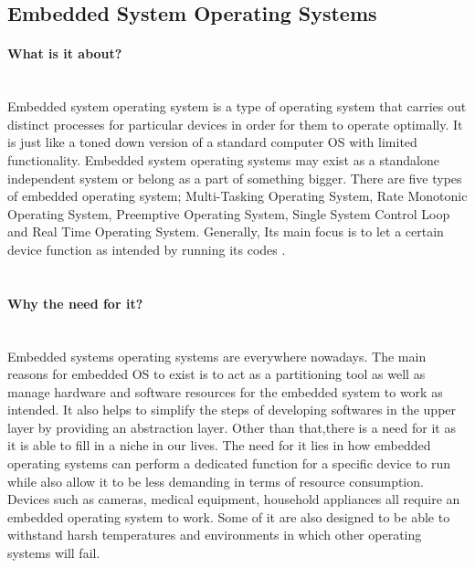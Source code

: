 \documentclass[conference]{IEEEtran}
\newcommand{\forceindent}{\leavevmode{\parindent=1em\indent}}
\begin{document}
\subsection{Embedded System Operating Systems}

\paragraph{What is it about?}\mbox{} \\
\forceindent Embedded system operating system is a type of operating system that carries out distinct processes for particular devices in order for them to operate optimally. It is just like a toned down version of a standard computer OS with limited functionality\cite{TNEOS}.
Embedded system operating systems may exist as a standalone independent system or belong as a part of something bigger. There are five types of embedded operating system; Multi-Tasking Operating System, Rate Monotonic Operating System, Preemptive Operating System, Single System Control Loop and Real Time Operating System. Generally, Its main focus is to let a certain device function as intended by running its codes
\cite{ITEOSMC}. \\

\\
\paragraph{Why the need for it?}\mbox{} \\
\forceindent Embedded systems operating systems are everywhere nowadays. The main reasons for embedded OS to exist is to act as a partitioning tool as well as manage hardware and software resources for the embedded system to work as intended. It also helps to simplify the steps of developing softwares in the upper layer by providing an abstraction layer.  Other than that,there is a need for it as it is able to fill in a niche in our lives. The need for it lies in how embedded operating systems can perform a dedicated function for a specific device to run while also allow it to be less demanding in terms of resource consumption. Devices such as cameras, medical equipment, household appliances all require an embedded operating system to work. Some of it are also designed to be able to withstand harsh temperatures and environments in which other operating systems will fail\cite{TNEOS}.
\end{document}
